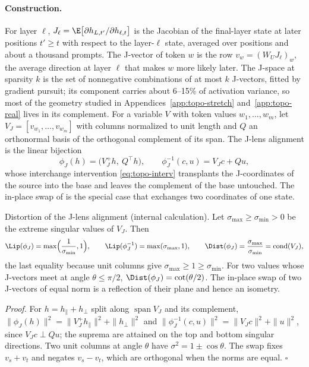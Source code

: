 \paragraph{Construction.} For layer $\ell$, $J_\ell=\E\bigl[\partial
h_{L,t'}/\partial h_{\ell,t}\bigr]$ is the Jacobian of the final-layer
state at later positions $t'\ge t$ with respect to the layer-$\ell$ state,
averaged over positions and about a thousand prompts. The J-vector of token
$w$ is the row $v_w=(W_UJ_\ell)_w$, the average direction at layer $\ell$
that makes $w$ more likely later. The J-space at sparsity $k$ is the set of
nonnegative combinations of at most $k$ J-vectors, fitted by gradient
pursuit; its component carries about 6--15\% of activation variance, so most
of the geometry studied in Appendices~\ref{app:topo-stretch}
and~\ref{app:topo-real} lives in its complement. For a variable $V$ with
token values $w_1,\dots,w_m$, let $V_J=[v_{w_1},\dots,v_{w_m}]$ with columns
normalized to unit length and $Q$ an orthonormal basis of the orthogonal
complement of its span. The J-lens alignment is the linear bijection
\begin{equation}
\phi_J(h)=\bigl(V_J^{+}h,\ Q^{\!\top}h\bigr),\qquad
\phi_J^{-1}(c,u)=V_Jc+Qu,
\label{eq:topo-jlens}
\end{equation}
whose interchange intervention \eqref{eq:topo-interv} transplants the
J-coordinates of the source into the base and leaves the complement of the
base untouched. The in-place swap of \cite{gurnee2026workspace} is the
special case that exchanges two coordinates of one state.

\begin{keybox}{Distortion of the J-lens alignment (internal calculation).}
Let $\sigma_{\max}\ge\sigma_{\min}>0$ be the extreme singular values of
$V_J$. Then
\begin{equation}
\Lip(\phi_J)=\max\Bigl(\frac1{\sigma_{\min}},1\Bigr),\qquad
\Lip(\phi_J^{-1})=\max(\sigma_{\max},1),\qquad
\Dist(\phi_J)=\frac{\sigma_{\max}}{\sigma_{\min}}=\operatorname{cond}(V_J),
\label{eq:topo-jlens-dist}
\end{equation}
the last equality because unit columns give $\sigma_{\max}\ge1\ge\sigma_{\min}$.
For two values whose J-vectors meet at angle $\theta\le\pi/2$,
$\Dist(\phi_J)=\cot(\theta/2)$. The in-place swap of two J-vectors of equal
norm is a reflection of their plane and hence an isometry.
\end{keybox}

\noindent\emph{Proof.} For $h=h_\parallel+h_\perp$ split along
$\operatorname{span}V_J$ and its complement,
$\|\phi_J(h)\|^2=\|V_J^+h_\parallel\|^2+\|h_\perp\|^2$ and
$\|\phi_J^{-1}(c,u)\|^2=\|V_Jc\|^2+\|u\|^2$, since $V_Jc\perp Qu$; the
suprema are attained on the top and bottom singular directions. Two unit
columns at angle $\theta$ have $\sigma^2=1\pm\cos\theta$. The swap fixes
$v_s+v_t$ and negates $v_s-v_t$, which are orthogonal when the norms are
equal. $\square$

